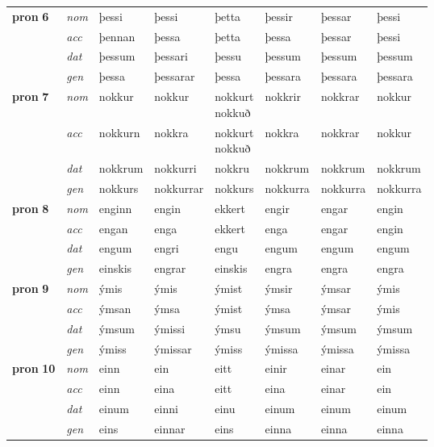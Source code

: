 \begin{longtable}[l]{l>{\footnotesize\itshape}lllllll}
\multirow{3}{*}{{{\textbf{pron} \Large{\textbf{6}}}}}  & nom & þessi & þessi    & þetta & þessir & þessar & þessi \\*
  & acc &  þennan  & þessa   & þetta & þessa & þessar & þessi \\*
&  dat & þessum & þessari   & þessu & þessum & þessum & þessum \\*
  & gen & þessa  & þessarar  & þessa & þessara & þessara & þessara\\
\cmidrule{1-8}

\multirow{3}{*}{{{\textbf{pron} \Large{\textbf{7}}}}}  & nom & nokkur & nokkur    & \specialcell{nokkurt\\ nokkuð} & nokkrir & nokkrar & nokkur \\*
  & acc &  nokkurn  & nokkra   & \specialcell{nokkurt\\ nokkuð} & nokkra & nokkrar & nokkur \\*
&  dat & nokkrum & nokkurri   & nokkru & nokkrum & nokkrum & nokkrum \\*
  & gen & nokkurs  & nokkurrar  & nokkurs & nokkurra & nokkurra & nokkurra\\
\cmidrule{1-8}

\multirow{3}{*}{{{\textbf{pron} \Large{\textbf{8}}}}}  & nom & enginn & engin    & ekkert & engir & engar & engin \\*
  & acc &  engan  & enga   & ekkert & enga & engar & engin \\*
&  dat & engum & engri   & engu & engum & engum & engum \\*
  & gen & einskis  & engrar  & einskis & engra & engra & engra\\
\cmidrule{1-8}

\multirow{3}{*}{{{\textbf{pron} \Large{\textbf{9}}}}}  & nom & ýmis & ýmis    & ýmist & ýmsir & ýmsar & ýmis \\*
  & acc &  ýmsan  & ýmsa   & ýmist & ýmsa & ýmsar & ýmis \\*
&  dat & ýmsum & ýmissi   & ýmsu & ýmsum & ýmsum & ýmsum \\*
  & gen & ýmiss  & ýmissar  & ýmiss & ýmissa & ýmissa & ýmissa\\
\cmidrule{1-8}

\multirow{3}{*}{{{\textbf{pron} \Large{\textbf{10}}}}}  & nom & einn & ein    & eitt & einir & einar & ein \\*
  & acc &  einn  & eina   & eitt & eina & einar & ein \\*
&  dat & einum & einni   & einu & einum & einum & einum \\*
  & gen & eins  & einnar  & eins & einna & einna & einna\\
\cmidrule{1-8}


\end{longtable}
